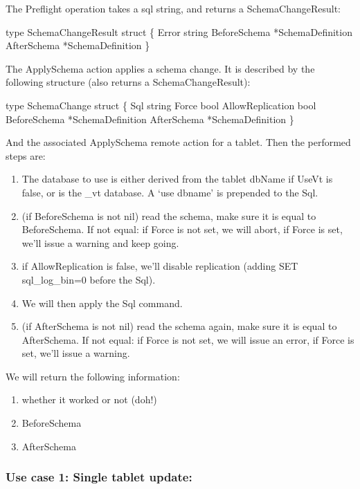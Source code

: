 The Preflight operation takes a sql string, and returns a SchemaChangeResult:
\begin{codesample4}
     type SchemaChangeResult struct \{
         Error        string
         BeforeSchema *SchemaDefinition
         AfterSchema  *SchemaDefinition
     \}
\end{codesample4}

The ApplySchema action applies a schema change. It is described by the following structure (also returns a SchemaChangeResult):
\begin{codesample4}
    type SchemaChange struct \{
     Sql              string
     Force            bool
     AllowReplication bool
     BeforeSchema     *SchemaDefinition
     AfterSchema      *SchemaDefinition
    \}
\end{codesample4}

And the associated ApplySchema remote action for a tablet. Then the performed steps are:
\begin{enumerate}
\item The database to use is either derived from the tablet dbName if UseVt is false, or is the \_vt database. A ‘use dbname’ is prepended to the Sql.
\item (if BeforeSchema is not nil) read the schema, make sure it is equal to BeforeSchema. If not equal: if Force is not set, we will abort, if Force is set, we’ll issue a warning and keep going.
\item if AllowReplication is false, we’ll disable replication (adding SET sql\_log\_bin=0 before the Sql).
\item We will then apply the Sql command.
\item (if AfterSchema is not nil) read the schema again, make sure it is equal to AfterSchema. If not equal: if Force is not set, we will issue an error, if Force is set, we’ll issue a warning.
\end{enumerate}

We will return the following information:
\begin{enumerate}
\item whether it worked or not (doh!)
\item BeforeSchema
\item  AfterSchema
\end{enumerate}

\subsubsection{Use case 1: Single tablet update:}\hypertarget{use-case-1-single-tablet-update}{}\label{use-case-1-single-tablet-update}

